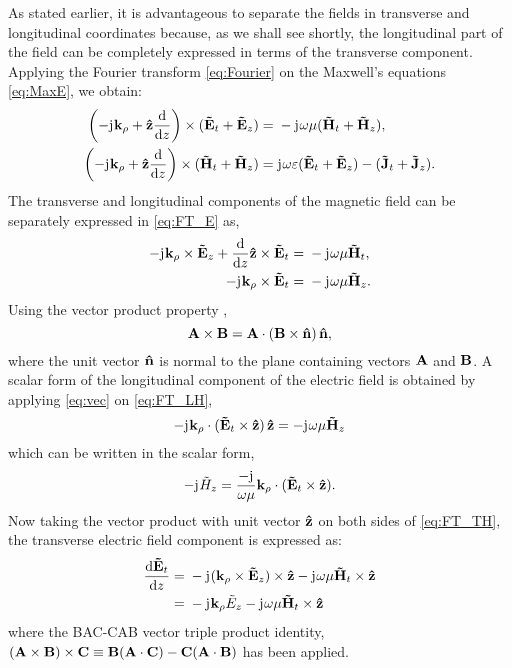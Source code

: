 \documentclass[12pt]{article}
\begin{document}
As stated earlier, it is advantageous to separate the fields in transverse and longitudinal coordinates because, as we shall see shortly, the longitudinal part of the field can be completely expressed in terms of the transverse component. Applying the Fourier transform \eqref{eq:Fourier} on the Maxwell's equations \eqref{eq:MaxE}, we obtain:
%
\begin{subequations}
  \begin{align}
    \left(-\mathrm{j}\mkern1mu \mathbf{k}_{\rho} + \mathbf{\hat{z}} \dv{}{z} \right)\times (\mathbf{\tilde{E}}_t + \mathbf{\tilde{E}}_z)  ={}& -\mathrm{j}\mkern1mu \omega \mu (\mathbf{\tilde{H}}_t + \mathbf{\tilde{H}}_z),
    \label{eq:FT_E}\\
    \left(-\mathrm{j}\mkern1mu \mathbf{k}_{\rho} + \mathbf{\hat{z}} \dv{}{z} \right)\times (\mathbf{\tilde{H}}_t + \mathbf{\tilde{H}}_z)  ={}& \mathrm{j}\mkern1mu \omega \varepsilon (\mathbf{\tilde{E}}_t + \mathbf{\tilde{E}}_z) -
    (\mathbf{\tilde{J}}_t + \mathbf{\tilde{J}}_z).
    \label{eq:FT_H}
  \end{align}
  \label{eq:FT_EH}%
\end{subequations}
%
The transverse and longitudinal components of the magnetic field can be separately expressed in \eqref{eq:FT_E} as,
%
\begin{subequations}
  \begin{align}
    -\mathrm{j}\mkern1mu \mathbf{k}_{\rho} \times \mathbf{\tilde{E}}_z +
    \dv{}{z}\mathbf{\hat{z}} \times \mathbf{\tilde{E}}_t ={}&
    -\mathrm{j}\mkern1mu \omega \mu \mathbf{\tilde{H}}_t,
    \label{eq:FT_TH}\\
    -\mathrm{j}\mkern1mu \mathbf{k}_{\rho} \times \mathbf{\tilde{E}}_t ={}&
    -\mathrm{j}\mkern1mu \omega \mu \mathbf{\tilde{H}}_z.
    \label{eq:FT_LH}
  \end{align}
  \label{eq:FT_TLH}%
\end{subequations}
%
Using the vector product property \cite[p. 117]{fang2010},
%
\begin{equation}
  \mathbf{A} \times \mathbf{B} =\mathbf{A} \cdot (\mathbf{B} \times \mathbf{\hat{n}}) \, \mathbf{\hat{n}},
  \label{eq:vec}
\end{equation}
%
where the unit vector $\mathbf{\hat{n}}$ is normal to the plane containing vectors $\mathbf{A}$ and $\mathbf{B}$. A scalar form of the longitudinal component of the electric field is obtained by applying \eqref{eq:vec} on \eqref{eq:FT_LH},
%
\begin{equation}
  - \mathrm{j}\mkern1mu \mathbf{k}_{\rho} \cdot (\mathbf{\tilde{E}}_t \times \mathbf{\hat{z}}) \, \mathbf{\hat{z}} =
  - \mathrm{j}\mkern1mu \omega \mu \mathbf{\tilde{H}}_z
  \label{eq:FT_LH}
\end{equation}
%
which can be written in the scalar form,
%
\begin{equation}
  - \mathrm{j}\mkern1mu \tilde{H}_z = \frac{- \mathrm{j}\mkern1mu}{\omega \mu}
  \mathbf{k}_{\rho} \cdot (\mathbf{\tilde{E}}_t \times \mathbf{\hat{z}}).
  \label{eq:sLH}
\end{equation}
%
Now taking the vector product with unit vector $\mathbf{\hat{z}}$ on both sides of \eqref{eq:FT_TH}, the transverse electric field component is expressed as:
%
\begin{equation}
  \begin{split}
    \dv{\v{\ti{E}}_t}{z} ={}& -\j (\v{k}_{\p} \x \v{\ti{E}}_z) \x \v{\^{z}}
    -\j \O \u \v{\ti{H}}_t \x \v{\^{z}}\\
    ={}& -\j \v{k}_{\p} \ti{{E}}_z -\j \O \u \v{\ti{H}}_t \x \v{\^{z}}
  \end{split}
  \label{eq:dFT_ET}%
\end{equation}
%
where the BAC-CAB vector triple product identity, $(\mathbf{A} \times \mathbf{B})\times\mathbf{C} \equiv \mathbf{B}(\mathbf{A} \cdot \mathbf{C}) - \mathbf{C}(\mathbf{A} \cdot \mathbf{B})$ has been applied.
\end{document}
